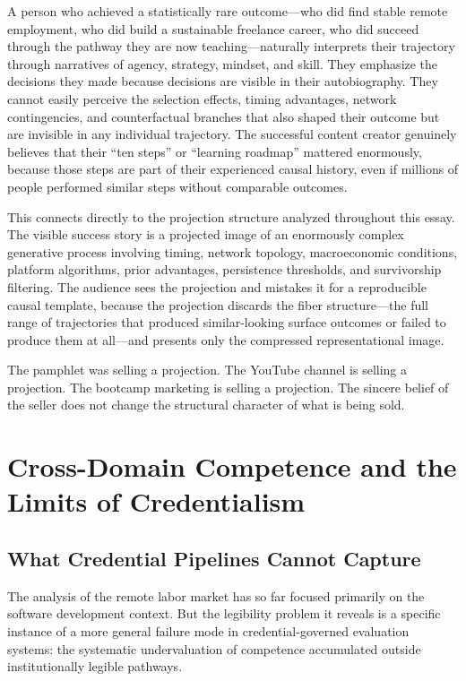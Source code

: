 \documentclass[12pt, a4paper]{article}
\theoremstyle{plain}
\theoremstyle{definition}
\theoremstyle{remark}
\begin{document}
A person who achieved a statistically rare outcome---who did find stable remote employment,
who did build a sustainable freelance career, who did succeed through the pathway
they are now teaching---naturally interprets their trajectory through
narratives of agency, strategy, mindset, and skill.
They emphasize the decisions they made because decisions are visible in their autobiography.
They cannot easily perceive the selection effects, timing advantages,
network contingencies, and counterfactual branches that also shaped their outcome
but are invisible in any individual trajectory.
The successful content creator genuinely believes that their ``ten steps''
or ``learning roadmap'' mattered enormously,
because those steps are part of their experienced causal history,
even if millions of people performed similar steps without comparable outcomes.

This connects directly to the projection structure analyzed throughout this essay.
The visible success story is a projected image of an enormously complex
generative process involving timing, network topology, macroeconomic conditions,
platform algorithms, prior advantages, persistence thresholds, and survivorship filtering.
The audience sees the projection and mistakes it for a reproducible causal template,
because the projection discards the fiber structure---the full range
of trajectories that produced similar-looking surface outcomes or failed to
produce them at all---and presents only the compressed representational image.

The pamphlet was selling a projection.
The YouTube channel is selling a projection.
The bootcamp marketing is selling a projection.
The sincere belief of the seller does not change the structural character
of what is being sold.

\section{Cross-Domain Competence and the Limits of Credentialism}
\label{sec:crossdomain}

\subsection{What Credential Pipelines Cannot Capture}

The analysis of the remote labor market has so far focused primarily on
the software development context.
But the legibility problem it reveals is a specific instance of a more general
failure mode in credential-governed evaluation systems:
the systematic undervaluation of competence accumulated outside
institutionally legible pathways.
\end{document}
